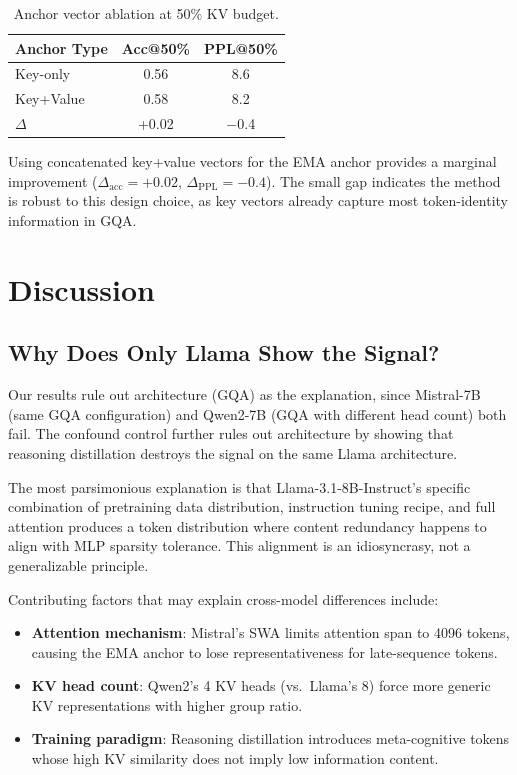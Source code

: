 \documentclass[11pt]{article}
\begin{document}
\begin{table}[h]
\centering
\caption{Anchor vector ablation at 50\% KV budget.}
\label{tab:ablation}
\small
\begin{tabular}{@{}lcc@{}}
\toprule
Anchor Type & Acc@50\% & PPL@50\% \\
\midrule
Key-only & 0.56 & 8.6 \\
Key+Value & 0.58 & 8.2 \\
$\Delta$ & +0.02 & $-$0.4 \\
\bottomrule
\end{tabular}
\end{table}

Using concatenated key+value vectors for the EMA anchor provides a marginal improvement ($\Delta_\text{acc}{=}{+}0.02$, $\Delta_\text{PPL}{=}{-}0.4$). The small gap indicates the method is robust to this design choice, as key vectors already capture most token-identity information in GQA.

\section{Discussion}

\subsection{Why Does Only Llama Show the Signal?}

Our results rule out architecture (GQA) as the explanation, since Mistral-7B (same GQA configuration) and Qwen2-7B (GQA with different head count) both fail. The confound control further rules out architecture by showing that reasoning distillation destroys the signal on the same Llama architecture.

The most parsimonious explanation is that Llama-3.1-8B-Instruct's specific combination of pretraining data distribution, instruction tuning recipe, and full attention produces a token distribution where content redundancy happens to align with MLP sparsity tolerance. This alignment is an idiosyncrasy, not a generalizable principle.

Contributing factors that may explain cross-model differences include:
\begin{itemize}
    \item \textbf{Attention mechanism}: Mistral's SWA limits attention span to 4096 tokens, causing the EMA anchor to lose representativeness for late-sequence tokens.
    \item \textbf{KV head count}: Qwen2's 4 KV heads (vs.\ Llama's 8) force more generic KV representations with higher group ratio.
    \item \textbf{Training paradigm}: Reasoning distillation introduces meta-cognitive tokens whose high KV similarity does not imply low information content.
\end{itemize}
\end{document}
